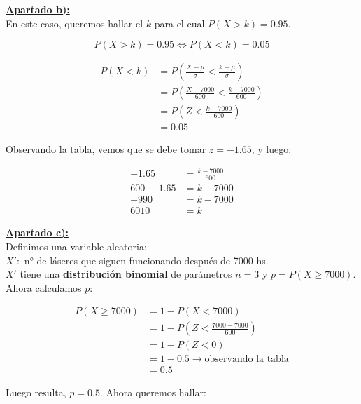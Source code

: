 \documentclass[11pt]{article}
\begin{document}
\textbf{\underline{Apartado b):}} \\

En este caso, queremos hallar el $ k $ para el cual $ P(X > k) = 0.95 $.

\begin{equation*}
  P(X > k) = 0.95 \iff P(X < k) = 0.05
\end{equation*}

\begin{align*}
  P(X < k) &= P(\frac{X - \mu}{\sigma} < \frac{k - \mu}{\sigma}) \\
           &= P(\frac{X - 7000}{600} < \frac{k - 7000}{600})     \\
           &= P(Z < \frac{k - 7000}{600})     \\
           &= 0.05
\end{align*}

Observando la tabla, vemos que se debe tomar $ z = -1.65 $, y luego:

\begin{align*}
  -1.65           &= \frac{k - 7000}{600} \\
  600 \cdot -1.65 &= k - 7000 \\
  -990            &= k - 7000 \\
  6010            &= k 
\end{align*}

\textbf{\underline{Apartado c):}} \\

Definimos una variable aleatoria: \\

$ X': $ n° de láseres que siguen funcionando después de 7000 hs. \\

$X' $ tiene una \textbf{distribución binomial} de parámetros $ n = 3 $ y 
$ p = P(X \geq 7000) $. Ahora calculamos $ p $:

\begin{align*}
  P(X \geq 7000) &= 1 - P(X < 7000) \\
                 &= 1 - P(Z < \frac{7000 - 7000}{600}) \\
                 &= 1 - P(Z < 0) \\
                 &= 1 - 0.5 \rightarrow \text{observando la tabla} \\
                 &= 0.5
\end{align*}

Luego resulta, $ p = 0.5 $. Ahora queremos hallar: \\
\end{document}
